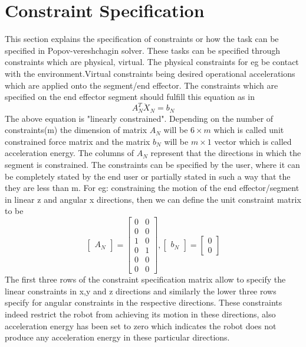 \section{Constraint Specification}
This section explains the specification of constraints or how the task can be specified in Popov-vereshchagin solver. These tasks can be specified through constraints which are physical, virtual. The physical constraints for eg be contact with the environment\cite{shakhimardanov2015}.Virtual constraints being desired operational accelerations which are applied onto the segment/end effector.\cite{shakhimardanov2015}
The constraints which are specified on the end effector segment should fulfill this equation as in \cite{shakhimardanov2015} 
$$A_{N}^{T}\ddot{X}_{N} = b_{N}$$ 
The above equation is "linearly constrained"\cite{shakhimardanov2015}. Depending on the number of constraints(m) the dimension of matrix $A_{N}$ will be $6\times m$ which is called unit constrained force matrix and the matrix $b_{N}$ will be $m\times 1$ vector which is called acceleration energy. The columns of $A_{N}$ represent that the directions in which the segment is constrained. The constraints can be specified by the user, where it can be completely stated by the end user or partially stated in such a way that the they are less than m. For eg: constraining the motion of the end effector/segment in linear z and angular x directions, then we can define the unit constraint matrix to be \cite{shakhimardanov2015}
\[
\begin{bmatrix}
	A_{N} 
\end{bmatrix}
=
\begin{bmatrix}
	0 & 0 \\ 0 & 0 \\ 1 & 0 \\ 0 & 1 \\ 0 & 0 \\ 0 & 0
\end{bmatrix},
\begin{bmatrix}
b_{N}
\end{bmatrix}
=
\begin{bmatrix}
 0 \\ 0
\end{bmatrix}
\]
The first three rows of the constraint specification matrix allow to specify the linear constraints in x,y and z directions and similarly the lower three rows specify for angular constraints in the respective directions. These constraints indeed restrict the robot from achieving its motion in these directions, also acceleration energy has been set to zero which indicates the robot does not produce any acceleration energy in these particular directions. 
